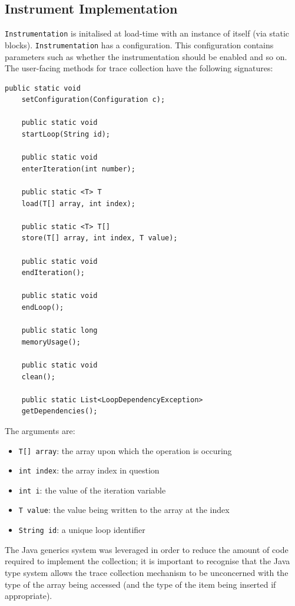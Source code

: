 	\subsection{Instrument Implementation} \label{sec:runtime/implementation/instrument}
	\texttt{Instrumentation} is initalised at load-time with an instance of itself (via static blocks). \texttt{Instrumentation} has a configuration. This configuration contains parameters such as whether the instrumentation should be enabled and so on.
	\newpage
	The user-facing methods for trace collection have the following signatures:
	
	\begin{lstlisting}[caption=Method signatures for instrumentation methods,label=lst:sigs]
	public static void
	setConfiguration(Configuration c);
	
	public static void
	startLoop(String id);
	
	public static void
	enterIteration(int number);
	
	public static <T> T
	load(T[] array, int index);
	
	public static <T> T[]
	store(T[] array, int index, T value);
	
	public static void
	endIteration();
	
	public static void
	endLoop();
	
	public static long
	memoryUsage();
	
	public static void
	clean();
	
	public static List<LoopDependencyException>
	getDependencies();\end{lstlisting}
	
	The arguments are:
	
	\begin{itemize} \label{items:trace-args}
		\item \texttt{T[] array}: the array upon which the operation is occuring
		\item \texttt{int index}: the array index in question
		\item \texttt{int i}: the value of the iteration variable
		\item \texttt{T value}: the value being written to the array at the index
		\item \texttt{String id}: a unique loop identifier
	\end{itemize}
	
	The Java generics system was leveraged in order to reduce the amount of code required to implement the collection; it is important to recognise that the Java type system allows the trace collection mechanism to be unconcerned with the type of the array being accessed (and the type of the item being inserted if appropriate).
	
